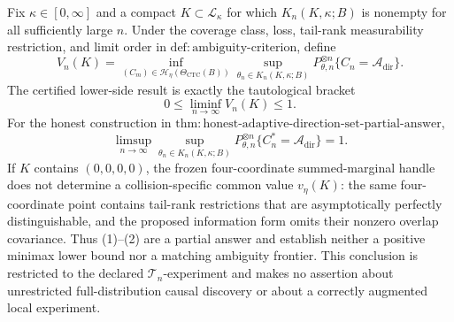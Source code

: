 Fix \(\kappa\in[0,\infty]\) and a compact \(K\subset\mathcal L_\kappa\) for which \(K_n(K,\kappa;B)\) is nonempty for all sufficiently large \(n\).  Under the coverage class, loss, tail-rank measurability restriction, and limit order in \(\mathrm{def{:}ambiguity\text{-}criterion}\), define
\[
 V_n(K)=
 \inf_{(C_m)\in\mathcal H_\eta(\Theta_{\mathrm{CTC}}(B))}
 \sup_{\theta_n\in K_n(K,\kappa;B)}
 P_{\theta,n}^{\otimes n}\{C_n=\mathcal A_{\mathrm{dir}}\}.
\]
The certified lower-side result is exactly the tautological bracket
\[
 0\leq\liminf_{n\to\infty}V_n(K)\leq1. \tag{1}
\]
For the honest construction in \(\mathrm{thm{:}honest\text{-}adaptive\text{-}direction\text{-}set\text{-}partial\text{-}answer}\),
\[
 \limsup_{n\to\infty}
 \sup_{\theta_n\in K_n(K,\kappa;B)}
 P_{\theta,n}^{\otimes n}\{C_n^*=\mathcal A_{\mathrm{dir}}\}=1. \tag{2}
\]
If \(K\) contains \((0,0,0,0)\), the frozen four-coordinate summed-marginal handle does not determine a collision-specific common value \(v_\eta(K)\): the same four-coordinate point contains tail-rank restrictions that are asymptotically perfectly distinguishable, and the proposed information form omits their nonzero overlap covariance.  Thus (1)--(2) are a partial answer and establish neither a positive minimax lower bound nor a matching ambiguity frontier.  This conclusion is restricted to the declared \(\mathcal T_n\)-experiment and makes no assertion about unrestricted full-distribution causal discovery or about a correctly augmented local experiment.